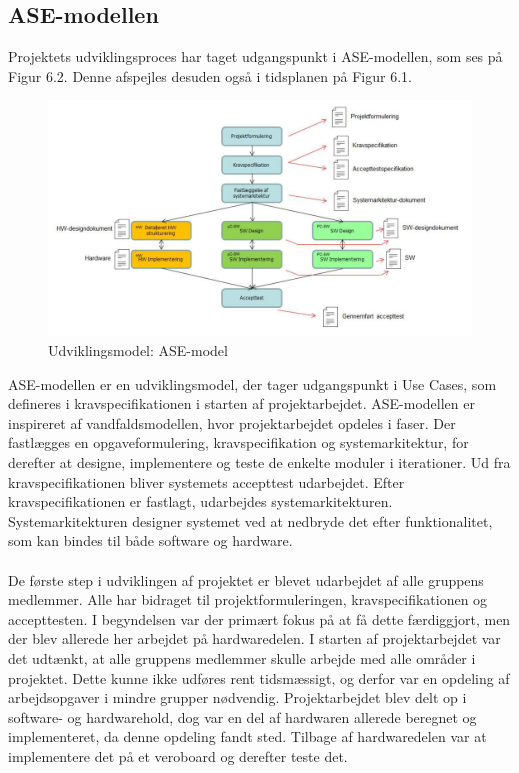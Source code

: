 \subsection{ASE-modellen}
Projektets udviklingsproces har taget udgangspunkt i ASE-modellen, som ses på Figur 6.2. Denne afspejles desuden også i tidsplanen på Figur 6.1. 
\begin{figure}[H]
	\centering
	\includegraphics[width=1\textwidth]{Figurer/asemodel}
	\caption{Udviklingsmodel: ASE-model \protect\cite[s. 6]{Vejledning}}
\end{figure}
ASE-modellen er en udviklingsmodel, der tager udgangspunkt i Use Cases, som defineres i kravspecifikationen i starten af projektarbejdet. ASE-modellen er inspireret af vandfaldsmodellen, hvor projektarbejdet opdeles i faser. Der fastlægges en opgaveformulering, kravspecifikation og systemarkitektur, for derefter at designe, implementere og teste de enkelte moduler i iterationer. Ud fra kravspecifikationen bliver systemets accepttest udarbejdet. Efter kravspecifikationen er fastlagt, udarbejdes systemarkitekturen. Systemarkitekturen designer systemet ved at nedbryde det efter funktionalitet, som kan bindes til både software og hardware. \\\\
De første step i udviklingen af projektet er blevet udarbejdet af alle gruppens medlemmer. Alle har bidraget til projektformuleringen, kravspecifikationen og accepttesten. I begyndelsen var der primært fokus på at få dette færdiggjort, men der blev allerede her arbejdet på hardwaredelen. I starten af projektarbejdet var det udtænkt, at alle gruppens medlemmer skulle arbejde med alle områder i projektet. Dette kunne ikke udføres rent tidsmæssigt, og derfor var en opdeling af arbejdsopgaver i mindre grupper nødvendig. Projektarbejdet blev delt op i software- og hardwarehold, dog var en del af hardwaren allerede beregnet og implementeret, da denne opdeling fandt sted. Tilbage af hardwaredelen var at implementere det på et veroboard og derefter teste det.

